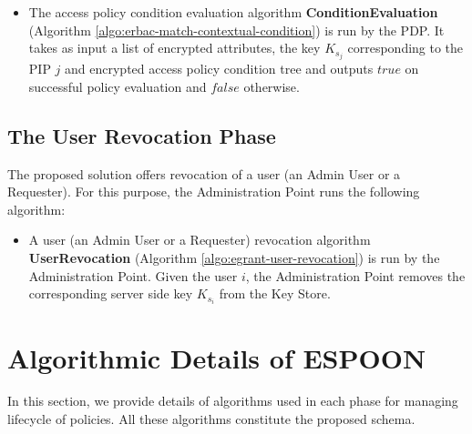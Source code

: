 \documentclass[epsfig,a4paper,11pt,titlepage]{book}
\numberwithin{algorithm}{chapter}
\begin{document}
\begin{itemize}

\item The access policy condition evaluation algorithm \textbf{ConditionEvaluation} (Algorithm \ref{algo:erbac-match-contextual-condition}) is run by the \gls{PDP}. It takes as input a list of encrypted attributes, the key $K_{s_j}$ corresponding to the \gls{PIP} $j$ and encrypted access policy condition tree and outputs $\mathit{true}$ on successful policy evaluation and $\mathit{false}$ otherwise.

\end{itemize}

\subsection{The User Revocation Phase}
The proposed solution offers revocation of a user (an Admin User or a Requester). For this purpose, the Administration Point runs the following algorithm:

\begin{itemize}

\item A user (an Admin User or a Requester) revocation algorithm \textbf{UserRevocation} (Algorithm \ref{algo:egrant-user-revocation}) is run by the Administration Point. Given the user $i$, the Administration Point removes the corresponding server side key $K_{s_i}$ from the Key Store.

\end{itemize}

\section[Algorithmic Details of ESPOON]{Algorithmic Details of \gls{ESPOON}}
\label{sec:espoon-algorithmic-details}
In this section, we provide details of algorithms used in each phase for managing lifecycle of policies. All these algorithms constitute the proposed schema. 
\end{document}
